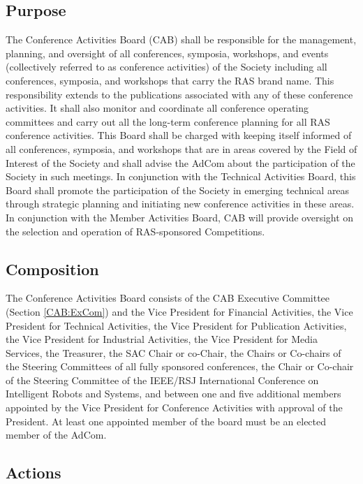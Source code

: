 \documentclass[10pt]{article}
\newcommand{\secref}[1]{Section \ref{#1}}
\begin{document}
\subsection{Purpose}

The Conference Activities Board (CAB) shall be responsible for the management, planning, and oversight of all conferences, symposia, workshops, and events (collectively referred to as conference activities) of the Society including all conferences, symposia, and workshops that carry the RAS brand name.  This responsibility extends to the publications associated with any of these conference activities. It shall also monitor and coordinate all conference operating committees and carry out all the long-term conference planning for all RAS conference activities. This Board shall be charged with keeping itself informed of all conferences, symposia, and workshops that are in areas covered by the Field of Interest of the Society and shall advise the AdCom about the participation of the Society in such meetings. In conjunction with the Technical Activities Board, this Board shall promote the participation of the Society in emerging technical areas through strategic planning and initiating new conference activities in these areas. In conjunction with the Member Activities Board, CAB will provide oversight on the selection and operation of RAS-sponsored Competitions. 


\subsection{Composition}

The Conference Activities Board consists of the CAB Executive Committee (\secref{CAB:ExCom}) and the Vice President for Financial Activities, the Vice President for Technical Activities, the Vice President for Publication Activities,  the Vice President for Industrial Activities, the Vice President for Media Services, the Treasurer, the SAC Chair or co-Chair, the Chairs or Co-chairs of the Steering Committees of all fully sponsored conferences, the Chair or Co-chair of the Steering Committee of the IEEE/RSJ International Conference on Intelligent Robots and Systems, and between one and five additional members appointed by the Vice President for Conference Activities with approval of the President. At least one appointed member of the board must be an elected member of the AdCom.  

\subsection{Actions}
\end{document}
